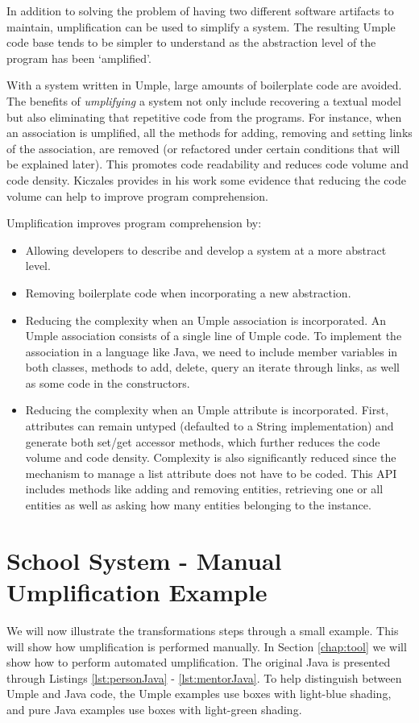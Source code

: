In addition to solving the problem of having two different software artifacts to maintain,   umplification can be used to simplify a system. The resulting Umple code base tends to be simpler to understand \cite{UmpleMAIN} as the abstraction level of the program has been `amplified'.

With a system written in Umple, large amounts of boilerplate code are avoided. The benefits of \textit{umplifying} a system not only include recovering a textual model but also eliminating that repetitive code from the programs. For instance, when an association is umplified, all the methods for adding, removing and setting links of the association, are removed (or refactored under certain conditions that will be explained later). This promotes code readability and reduces code volume and code density. Kiczales provides in his work \cite{kiczalesAOP} some evidence that reducing the code volume can help to improve program comprehension.

Umplification improves program comprehension by:
\begin{itemize}
\item Allowing developers to describe and develop a system at a more abstract level.

\item Removing boilerplate code when incorporating a new abstraction.

\item Reducing the complexity when an Umple association is incorporated. An Umple association consists of a single line of Umple code. To implement the association in a language like Java, we need to include member variables in both classes, methods to add, delete, query an iterate through links, as well as some code in the constructors.

\item Reducing the complexity when an Umple attribute is incorporated. First, attributes can remain untyped (defaulted to a String implementation) and generate both set/get accessor methods, which further reduces the code volume and code density. Complexity is also significantly reduced since the mechanism to manage a list attribute does not have to be coded. This API includes methods like adding and removing entities, retrieving one or all entities as well as asking how many entities belonging to the instance.
\end{itemize}

\section{School System - Manual Umplification Example}
We will now illustrate the transformations steps through a small example. This will show how umplification is performed manually. In Section \ref{chap:tool} we will show how to perform automated umplification. The original Java is presented through Listings \ref{lst:personJava} - \ref{lst:mentorJava}.
To help distinguish between Umple and Java code, the Umple examples use boxes with {\color{blue} light-blue}  shading, and pure Java examples use boxes with {\color{green} light-green} shading.

